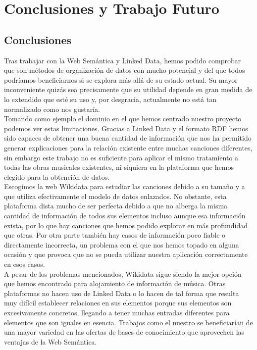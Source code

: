 \chapter{Conclusiones y Trabajo Futuro}
\label{cap:conclusiones}

\section{Conclusiones}

Tras trabajar con la Web Semántica y Linked Data, hemos podido comprobar que son métodos de organización de datos con mucho potencial y del que todos podríamos beneficiarnos si se explora más allá de su estado actual. Su mayor inconveniente quizás sea precisamente que su utilidad depende en gran medida de lo extendido que esté su uso y, por desgracia, actualmente no está tan normalizado como nos gustaría.\\

Tomando como ejemplo el dominio en el que hemos centrado nuestro proyecto podemos ver estas limitaciones. Gracias a Linked Data y el formato RDF hemos sido capaces de obtener una buena cantidad de información que nos ha permitido generar explicaciones para la relación existente entre muchas canciones diferentes, sin embargo este trabajo no es suficiente para aplicar el mismo tratamiento a todas las obras musicales existentes, ni siquiera en la plataforma que hemos elegido para la obtención de datos.\\

Escogimos la web Wikidata para estudiar las canciones debido a su tamaño y a que utiliza efectivamente el modelo de datos enlazados. No obstante, esta plataforma dista mucho de ser perfecta debido a que no alberga la misma cantidad de información de todos sus elementos incluso aunque esa información exista, por lo que hay canciones que hemos podido explorar en más profundidad que otras. Por otra parte también hay casos de información poco fiable o directamente incorrecta, un problema con el que nos hemos topado en alguna ocasión y que provoca que no se pueda utilizar nuestra aplicación correctamente en esos casos.\\

A pesar de los problemas mencionados, Wikidata sigue siendo la mejor opción que hemos encontrado para alojamiento de información de música. Otras plataformas no hacen uso de Linked Data o lo hacen de tal forma que resulta muy difícil establecer relaciones en sus elementos porque sus elementos son excesivamente concretos, llegando a tener muchas entradas diferentes para elementos que son iguales en esencia. Trabajos como el nuestro se beneficiarían de una mayor variedad en las ofertas de bases de conocimiento que aprovechen las ventajas de la Web Semántica.\\

